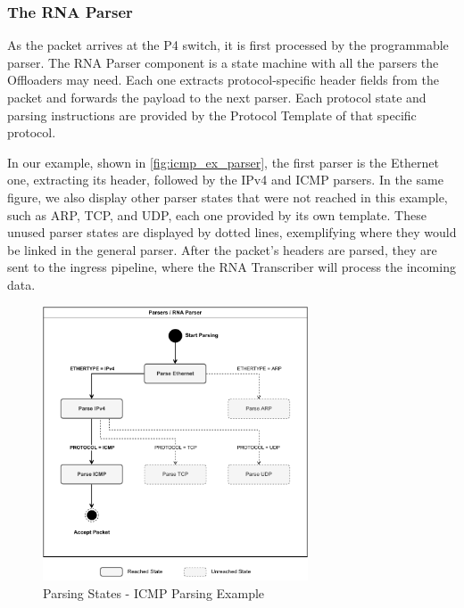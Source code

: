 \subsubsection*{The RNA Parser}

As the packet arrives at the P4 switch, it is first processed by the programmable parser. The RNA Parser component is a state machine with all the parsers the Offloaders may need. Each one extracts protocol-specific header fields from the packet and forwards the payload to the next parser. Each protocol state and parsing instructions are provided by the Protocol Template of that specific protocol.

In our example, shown in \autoref{fig:icmp_ex_parser}, the first parser is the Ethernet one, extracting its header, followed by the IPv4 and ICMP parsers. In the same figure, we also display other parser states that were not reached in this example, such as ARP, TCP, and UDP, each one provided by its own template. These unused parser states are displayed by dotted lines, exemplifying where they would be linked in the general parser. After the packet's headers are parsed, they are sent to the ingress pipeline, where the RNA Transcriber will process the incoming data.

\begin{figure}[ht]
    \caption{Parsing States - ICMP Parsing Example}
    \begin{center}
        \includegraphics[width=0.7\textwidth]{images/icmp_ex_parser.pdf}  
    \end{center}
    \label{fig:icmp_ex_parser}
\end{figure}

